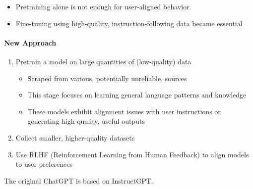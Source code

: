 \begin{itemize}

  \item Pretraining alone is not enough for user-aligned behavior.
  \item  Fine-tuning using high-quality, instruction-following data became essential
\end{itemize}

\paragraph{New Approach}

\begin{enumerate}
  \item Pretrain a model on large quantities of (low-quality) data

        \begin{itemize}
          \item Scraped from various, potentially unreliable, sources
          \item This stage focuses on learning general language patterns and knowledge
          \item These models exhibit alignment issues with user instructions or generating high-quality,
                useful outputs
        \end{itemize}

  \item Collect smaller, higher-quality datasets
  \item Use RLHF (Reinforcement Learning from Human Feedback) to align models to user preferences
\end{enumerate}


The original ChatGPT is based on InstructGPT.

















